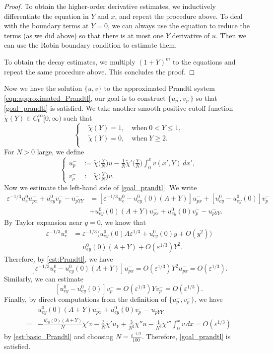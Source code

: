 \documentclass[reqno, 11pt]{amsart}
\theoremstyle{plain}
\theoremstyle{definition}
\theoremstyle{remark}
\numberwithin{equation}{section}
\begin{document}
\begin{proof}
To obtain the higher-order derivative estimates, we inductively differentiate the equation in $Y$ and $x$, and repeat the procedure above. To deal with the boundary terms at $Y=0$, we can always use the equation to reduce the terms (as we did above) so that there is at most one $Y$ derivative of $u$. Then we can use the Robin boundary condition to estimate them.

To obtain the decay estimates, we multiply $(1+Y)^m$ to the equations and repeat the same procedure above. This concludes the proof.
\end{proof}

Now we have the solution $\{u,v\}$ to the approximated Prandtl system \eqref{eqn:approximated_Prandtl}, our goal is to construct $\{u_p^-,v_p^-\}$ so that \eqref{goal_prandtl} is satisfied. We take another smooth positive cutoff function $\tilde{\chi}(Y) \in C_0^\infty[0,\infty)$ such that
$$
\left\{
\begin{aligned}
& \tilde\chi(Y) = 1, \quad \mbox{when}~0<Y\le 1,\\
& \tilde\chi(Y) = 0, \quad \mbox{when}~Y \ge 2.\\
\end{aligned}
\right.
$$
For $N>0$ large, we define
$$
\left\{
\begin{aligned}
u_p^- &:= \tilde{\chi}\Big(\frac{Y}{N}\Big) u - \frac{1}{N} \tilde{\chi}' \Big(\frac{Y}{N}\Big) \int_0^x v(x',Y) \, dx',\\
v_p^- &:= \tilde{\chi}\Big(\frac{Y}{N}\Big) v.
\end{aligned}
\right.
$$
Now we estimate the left-hand side of \eqref{goal_prandtl}. We write
\begin{align*}
\varepsilon^{-1/3} u_e^0 u_{px}^- + u_{ey}^0 v_p^- - u_{pYY}^- &= [\varepsilon^{-1/3} u_e^0 - u_{ey}^0(0)(A+Y)]u_{px}^- + [ u_{ey}^0 - u_{ey}^0(0)] v_p^-\\
&+ u_{ey}^0(0)(A+Y) u_{px}^- + u_{ey}^0(0) v_p^- - u_{pYY}^-.
\end{align*}
By Taylor expansion near $y = 0$, we know that
\begin{align*}
\varepsilon^{-1/3} u_e^0 &= \varepsilon^{-1/3} \Big( u_{ey}^0(0) A \varepsilon^{1/3} +  u_{ey}^0(0) y + O(y^2) \Big)\\
&= u_{ey}^0(0) (A+Y) + O(\varepsilon^{1/3})Y^2.
\end{align*}
Therefore, by \eqref{est:Prandtl}, we have
$$
[\varepsilon^{-1/3} u_e^0 - u_{ey}^0(0)(A+Y)]u_{px}^- = O(\varepsilon^{1/3})Y^2 u_{px}^- = O(\varepsilon^{1/3}).
$$
Similarly, we can estimate
$$
[ u_{ey}^0 - u_{ey}^0(0)] v_p^- = O(\varepsilon^{1/3})Y v_p^- = O(\varepsilon^{1/3}).
$$
Finally, by direct computations from the definition of $\{u_p^-,v_p^-\}$, we have
\begin{align*}
&u_{ey}^0(0)(A+Y) u_{px}^- + u_{ey}^0(0) v_p^- - u_{pYY}^-\\
=& - \frac{u_{ey}^0(0)(A+Y)}{N} \tilde{\chi}' v - \frac{3}{N} \tilde{\chi}' u_Y + \frac{3}{N^2} \tilde{\chi}''u - \frac{1}{N^3} \tilde{\chi}''' \int_0^x v \, dx = O(\varepsilon^{1/3})
\end{align*}
by \eqref{est:basic_Prandtl} and choosing $N = \frac{\varepsilon^{-1/3}}{100}$. Therefore, \eqref{goal_prandtl} is satisfied.\\
\end{document}
